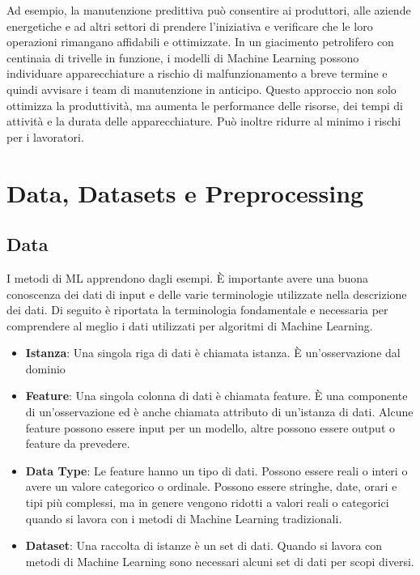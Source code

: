 Ad esempio, la manutenzione predittiva può consentire ai produttori, alle aziende energetiche e ad altri settori di prendere l'iniziativa e verificare che le loro operazioni rimangano affidabili e ottimizzate. In un giacimento petrolifero con centinaia di trivelle in funzione, i modelli di Machine Learning possono individuare apparecchiature a rischio di malfunzionamento a breve termine e quindi avvisare i team di manutenzione in anticipo. Questo approccio non solo ottimizza la produttività, ma aumenta le performance delle risorse, dei tempi di attività e la durata delle apparecchiature. Può inoltre ridurre al minimo i rischi per i lavoratori.
\cite{introML}

\newpage
\section{Data, Datasets e Preprocessing}
\vspace{8mm}
\subsection{Data}
I metodi di \acf{ML} apprendono dagli esempi. È importante avere una buona conoscenza dei dati di input e delle varie terminologie utilizzate nella descrizione dei dati. Di seguito è riportata la terminologia fondamentale e necessaria per comprendere al meglio i dati utilizzati per algoritmi di Machine Learning.

\begin{itemize}
    \item \textbf{Istanza}: Una singola riga di dati è chiamata istanza. È un'osservazione dal dominio
    \item \textbf{Feature}: Una singola colonna di dati è chiamata feature. È una componente di un'osservazione ed è anche chiamata attributo di un'istanza di dati. Alcune feature possono essere input per un modello, altre possono essere output o feature da prevedere.
    \item \textbf{Data Type}: Le feature hanno un tipo di dati. Possono essere reali o interi o avere un valore categorico o ordinale. Possono essere stringhe, date, orari e tipi più complessi, ma in genere vengono ridotti a valori reali o categorici quando si lavora con i metodi di Machine Learning tradizionali.
    \item \textbf{Dataset}: Una raccolta di istanze è un set di dati. Quando si lavora con metodi di Machine Learning sono necessari alcuni set di dati per scopi diversi.
\end{itemize} 

